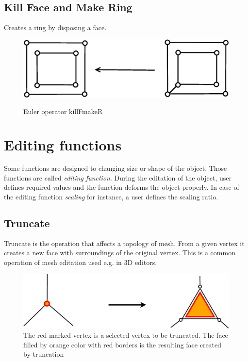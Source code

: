 \subsection{Kill Face and Make Ring}

Creates a ring by disposing a face.

\begin{figure}[H]
\centering
\includegraphics[scale=0.25]{../img/killFmakeR.eps}
\label{fig:killfmaker}
\caption{Euler operator killFmakeR}
\end{figure}


\section{Editing functions}
\label{sec:edit_f}
Some functions are designed to changing size or shape of the object. Those functions are called 
\emph{editing function}.
During the editation of the object, user defines required values and the function deforms the
object properly. In case of the editing function \emph{scaling} for instance, a user defines the scaling
ratio.

\subsection{Truncate}

Truncate is the operation that affects a topology of mesh. From a given vertex it creates a new face with
surroundings of the original vertex. This is a common operation of mesh editation used e.g. in
3D editors.\\

\begin{figure}[ht]
\centering
\includegraphics[scale=0.2]{../img/truncate.eps}
\caption{The red-marked vertex is a selected vertex to be truncated.
The face filled by orange color with red borders is the resulting face created by truncation}
\end{figure}

